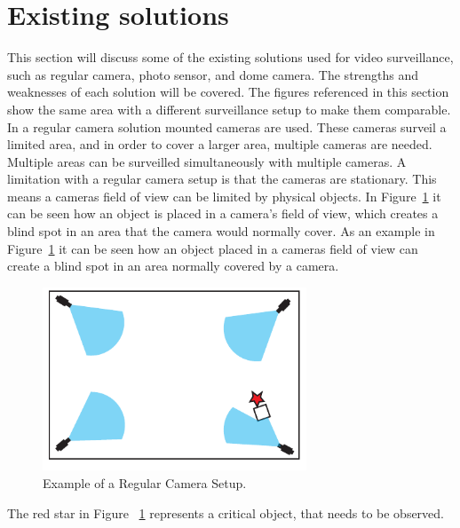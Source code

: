 \section{Existing solutions}
This section will discuss some of the existing solutions used for video surveillance, such as regular camera, photo sensor, and dome camera.
The strengths and weaknesses of each solution will be covered.
The figures referenced in this section show the same area with a different surveillance setup to make them comparable. \\

In a regular camera solution mounted cameras are used.
These cameras surveil a limited area, and in order to cover a larger area, multiple cameras are needed.
Multiple areas can be surveilled simultaneously with multiple cameras.
A limitation with a regular camera setup is that the cameras are stationary.
This means a cameras field of view can be limited by physical objects.
In Figure~\ref{fig:refular_camera_setup} it can be seen how an object is placed in a camera's field of view, which creates a blind spot in an area that the camera would normally cover.
As an example in Figure~\ref{fig:refular_camera_setup} it can be seen how an object placed in a cameras field of view can create a blind spot in an area normally covered by a camera. \\

\begin{figure}[htb]
    \centering
    \includegraphics[width=0.7\textwidth]{gfx/regular_camera_setup.pdf}
    \caption{Example of a Regular Camera Setup.}
    \label{fig:refular_camera_setup}
\end{figure}


The red star in Figure ~\ref{fig:refular_camera_setup} represents a critical object, that needs to be observed. \\


